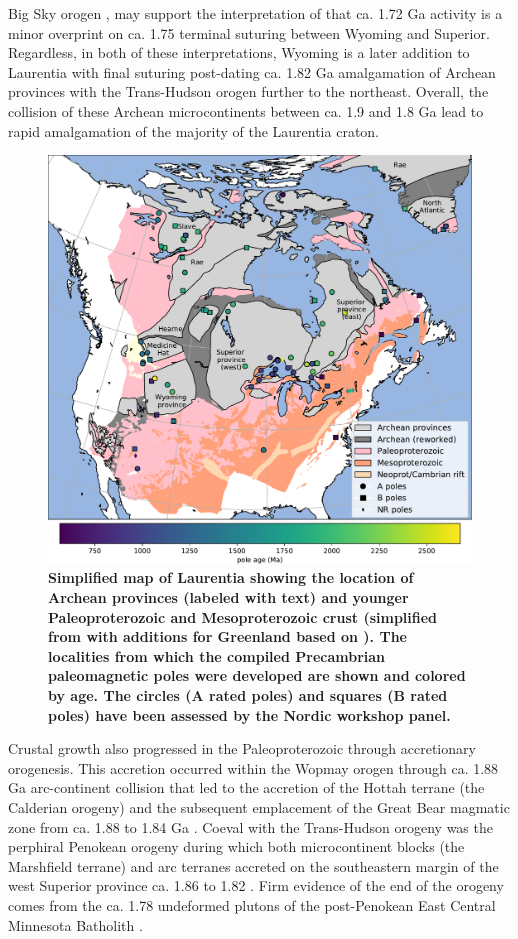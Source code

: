 \documentclass[11pt,letterpaper]{article}
\begin{document}
Big Sky orogen \citep{Condit2015a}, may support the interpretation of \citet{Hrncir2017a} that ca. 1.72 Ga activity is a minor overprint on ca. 1.75 terminal suturing between Wyoming and Superior. Regardless, in both of these interpretations, Wyoming is a later addition to Laurentia with final suturing post-dating ca. 1.82 Ga amalgamation of Archean provinces with the Trans-Hudson orogen further to the northeast. Overall, the collision of these Archean microcontinents between ca. 1.9 and 1.8 Ga lead to rapid amalgamation of the majority of the Laurentia craton.

\begin{figure}
\centering
\includegraphics[width=\textwidth]{../Figures/Fig1_map.pdf}
\caption{\small{\textbf{Simplified map of Laurentia showing the location of Archean provinces (labeled with text) and younger Paleoproterozoic and Mesoproterozoic crust (simplified from \citealp{Whitmeyer2007a} with additions for Greenland based on \citealp{St-Onge2009a}). The localities from which the compiled Precambrian paleomagnetic poles were developed are shown and colored by age. The circles (A rated poles) and squares (B rated poles) have been assessed by the Nordic workshop panel.}}}
\label{fig:Laurentia_map}
\end{figure} 

Crustal growth also progressed in the Paleoproterozoic through accretionary orogenesis. This accretion occurred within the Wopmay orogen through ca. 1.88 Ga arc-continent collision that led to the accretion of the Hottah terrane (the Calderian orogeny) and the subsequent emplacement of the Great Bear magmatic zone from ca. 1.88 to 1.84 Ga \citep{Hildebrand2009a}. Coeval with the Trans-Hudson orogeny was the perphiral Penokean orogeny during which both microcontinent blocks (the Marshfield terrane) and arc terranes accreted on the southeastern margin of the west Superior province ca. 1.86 to 1.82 \citep{Schulz2007a}. Firm evidence of the end of the orogeny comes from the ca. 1.78 undeformed plutons of the post-Penokean East Central Minnesota Batholith \citep{Holm2005a}. 
\end{document}
